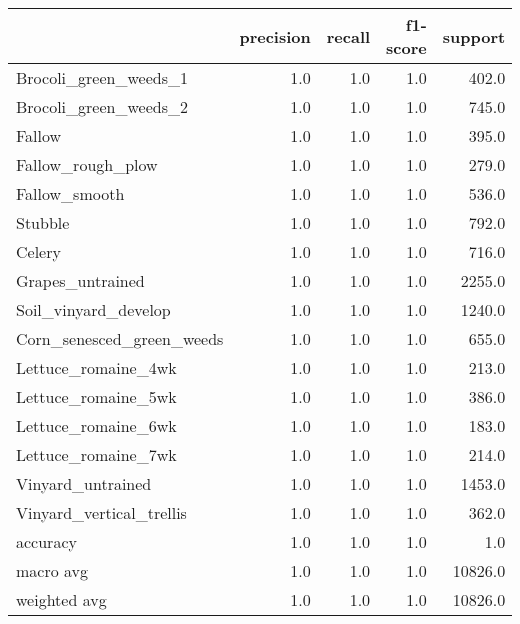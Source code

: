 \begin{tabular}{lrrrr}
\toprule
{} &  precision &  recall &  f1-score &  support \\
\midrule
Brocoli\_green\_weeds\_1     &        1.0 &     1.0 &       1.0 &    402.0 \\
Brocoli\_green\_weeds\_2     &        1.0 &     1.0 &       1.0 &    745.0 \\
Fallow                    &        1.0 &     1.0 &       1.0 &    395.0 \\
Fallow\_rough\_plow         &        1.0 &     1.0 &       1.0 &    279.0 \\
Fallow\_smooth             &        1.0 &     1.0 &       1.0 &    536.0 \\
Stubble                   &        1.0 &     1.0 &       1.0 &    792.0 \\
Celery                    &        1.0 &     1.0 &       1.0 &    716.0 \\
Grapes\_untrained          &        1.0 &     1.0 &       1.0 &   2255.0 \\
Soil\_vinyard\_develop      &        1.0 &     1.0 &       1.0 &   1240.0 \\
Corn\_senesced\_green\_weeds &        1.0 &     1.0 &       1.0 &    655.0 \\
Lettuce\_romaine\_4wk       &        1.0 &     1.0 &       1.0 &    213.0 \\
Lettuce\_romaine\_5wk       &        1.0 &     1.0 &       1.0 &    386.0 \\
Lettuce\_romaine\_6wk       &        1.0 &     1.0 &       1.0 &    183.0 \\
Lettuce\_romaine\_7wk       &        1.0 &     1.0 &       1.0 &    214.0 \\
Vinyard\_untrained         &        1.0 &     1.0 &       1.0 &   1453.0 \\
Vinyard\_vertical\_trellis  &        1.0 &     1.0 &       1.0 &    362.0 \\
accuracy                  &        1.0 &     1.0 &       1.0 &      1.0 \\
macro avg                 &        1.0 &     1.0 &       1.0 &  10826.0 \\
weighted avg              &        1.0 &     1.0 &       1.0 &  10826.0 \\
\bottomrule
\end{tabular}
